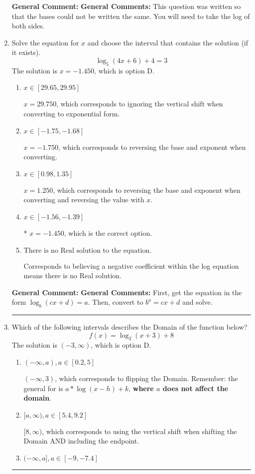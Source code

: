 \documentclass{extbook}[14pt]
\newcommand{\litem}[1]{\item #1

\rule{\textwidth}{0.4pt}}
\begin{document}
\begin{enumerate}
{\textbf{General Comment:} \textbf{General Comments:} This question was written so that the bases could not be written the same. You will need to take the log of both sides.
}
\litem{
Solve the equation for $x$ and choose the interval that contains the solution (if it exists).
\[ \log_{5}{(4x+6)}+4 = 3 \]The solution is \( x = -1.450 \), which is option D.\begin{enumerate}[label=\Alph*.]
\item \( x \in [29.65, 29.95] \)

$x = 29.750$, which corresponds to ignoring the vertical shift when converting to exponential form.
\item \( x \in [-1.75, -1.68] \)

$x = -1.750$, which corresponds to reversing the base and exponent when converting.
\item \( x \in [0.98, 1.35] \)

$x = 1.250$, which corresponds to reversing the base and exponent when converting and reversing the value with $x$.
\item \( x \in [-1.56, -1.39] \)

* $x = -1.450$, which is the correct option.
\item \( \text{There is no Real solution to the equation.} \)

Corresponds to believing a negative coefficient within the log equation means there is no Real solution.
\end{enumerate}

\textbf{General Comment:} \textbf{General Comments:} First, get the equation in the form $\log_b{(cx+d)} = a$. Then, convert to $b^a = cx+d$ and solve.
}
\litem{
Which of the following intervals describes the Domain of the function below?
\[ f(x) = \log_2{(x+3)}+8 \]The solution is \( (-3, \infty) \), which is option D.\begin{enumerate}[label=\Alph*.]
\item \( (-\infty, a), a \in [0.2, 5] \)

$(-\infty, 3)$, which corresponds to flipping the Domain. Remember: the general for is $a*\log(x-h)+k$, \textbf{where $a$ does not affect the domain}.
\item \( [a, \infty), a \in [5.4, 9.2] \)

$[8, \infty)$, which corresponds to using the vertical shift when shifting the Domain AND including the endpoint.
\item \( (-\infty, a], a \in [-9, -7.4] \)


\end{enumerate}}
\end{enumerate}
\end{document}
